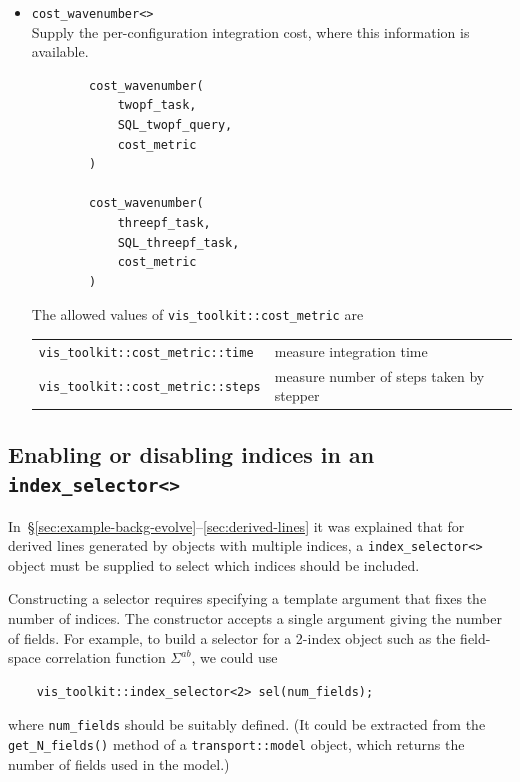 \documentclass[11pt,a4paper]{article}
\begin{document}
\begin{itemize}
    \item \texttt{cost_wavenumber<>} \\
    Supply the per-configuration integration cost, where this information is
    available.
    \begin{verbatim}
        cost_wavenumber(
            twopf_task,    
            SQL_twopf_query,
            cost_metric
        )
        
        cost_wavenumber(
            threepf_task,
            SQL_threepf_task,
            cost_metric
        )
    \end{verbatim}
    The allowed values of \texttt{vis_toolkit::cost_metric}
    are \\
    \begin{tabular}{p{6cm}p{8.5cm}}
        \texttt{vis_toolkit::cost_metric::time} &
            measure integration time \\
        \texttt{vis_toolkit::cost_metric::steps} &
            measure number of steps taken by stepper
    \end{tabular}

\end{itemize}

\subsection{Enabling or disabling indices in an \texttt{index_selector<>}}
\label{sec:index-selector}

In~\S\ref{sec:example-backg-evolve}--\ref{sec:derived-lines}
it was explained that
for derived lines generated by objects with multiple indices, a
\texttt{index_selector<>} object must be supplied
to select which indices should be included.

Constructing a selector requires specifying a template argument that fixes the
number of indices.
The constructor accepts a single argument giving the number
of fields.
For example, to build a selector for a 2-index object such as the field-space
correlation function $\Sigma^{ab}$, we could use
\begin{verbatim}
	vis_toolkit::index_selector<2> sel(num_fields);
\end{verbatim}
where \texttt{num_fields} should be suitably defined.
(It could be extracted from the \texttt{get_N_fields()} method of a
\texttt{transport::model} object, which returns the number of
fields used in the model.)
\end{document}
